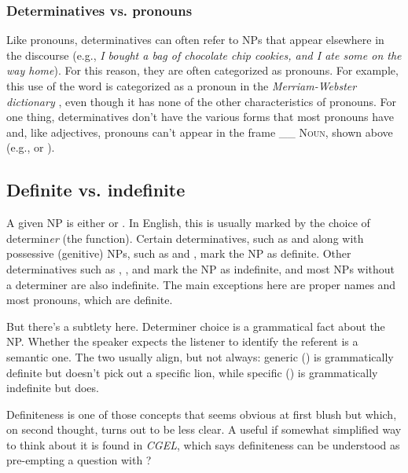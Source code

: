 \subsubsection*{Determinatives vs. pronouns}

Like pronouns, determinatives can often refer to NPs that appear elsewhere in the discourse (e.g., \textit{I bought \emph{a bag of chocolate chip cookies}, and I ate \emph{some} on the way home}). For this reason, they are often categorized as pronouns. For example, this use of the word  is categorized as a pronoun in the \textit{Merriam-Webster dictionary} \citep{MerriamWebsterDictionary}, even though it has none of the other characteristics of pronouns. For one thing, determinatives don't have the various forms that most pronouns have and, like adjectives, pronouns can't appear in the frame \_\_  \textsc{Noun}, shown above (e.g.,  or ).

\subsection{Definite vs. indefinite}
\label{sec:definite-v-indef}

A given NP is either  or . In English, this is usually marked by the choice of determin\emph{er} (the function). Certain determinatives, such as  and  along with possessive (genitive) NPs, such as  and , mark the NP as definite. Other determinatives such as , , and  mark the NP as indefinite, and most NPs without a determiner are also indefinite. The main exceptions here are proper names and most pronouns, which are definite.

But there's a subtlety here. Determiner choice is a grammatical fact about the NP. Whether the speaker expects the listener to identify the referent is a semantic one. The two usually align, but not always: generic  () is grammatically definite but doesn't pick out a specific lion, while specific  () is grammatically indefinite but does.

Definiteness is one of those concepts that seems obvious at first blush but which, on second thought, turns out to be less clear. A useful if somewhat simplified way to think about it is found in \textit{CGEL}, which says definiteness can be understood as pre-empting a question with ? 

